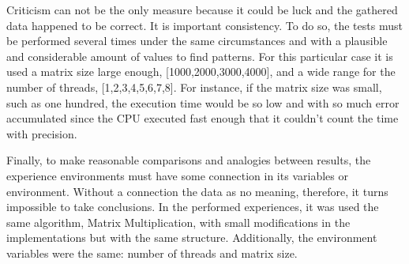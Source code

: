 Criticism can not be the only measure because it could be luck and the gathered data happened to be correct. It is important consistency. To do so, the tests must be performed several times under the same circumstances and with a plausible and  considerable amount of values to find patterns. For this particular case  it is used a matrix size large enough, [1000,2000,3000,4000], and a wide range for the number of threads, [1,2,3,4,5,6,7,8]. For instance, if the matrix size was small, such as one hundred, the execution time would be so low and with so much error accumulated since the CPU executed fast enough that it couldn't count the time with precision. 

Finally, to make reasonable comparisons and analogies between results, the experience environments must have some connection in its variables or environment. Without a connection the data as no meaning, therefore, it turns impossible to take conclusions. In the performed experiences, it was used the same algorithm, Matrix Multiplication, with small modifications in the implementations but with the same structure. Additionally, the environment variables were the same: number of threads and matrix size.

  

